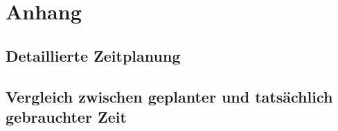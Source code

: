 \section{Anhang}
\subsection{Detaillierte Zeitplanung}
\label{app:Zeitplanung}


\subsection{Vergleich zwischen geplanter und tatsächlich gebrauchter Zeit}
\label{app:ZeitplanungReal}

\clearpage










